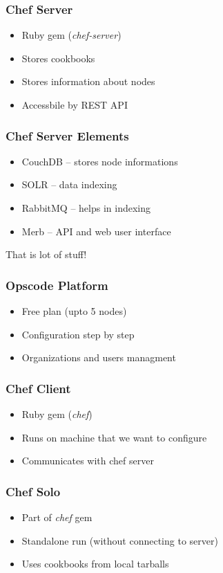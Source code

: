 \documentclass[16pt]{beamer}
\begin{document}
\begin{frame}
  \frametitle{Chef Server}
  \begin{itemize}
    \item Ruby gem (\emph{chef-server})
    \item Stores cookbooks
    \item Stores information about nodes
    \item Accessbile by REST API
  \end{itemize}
\end{frame}

\begin{frame}
  \frametitle{Chef Server Elements}
  \begin{itemize}
    \item CouchDB -- stores node informations
    \item SOLR -- data indexing
    \item RabbitMQ -- helps in indexing
    \item Merb -- API and web user interface
  \end{itemize}
  \pause
  \begin{center}
    \LARGE \color{red} That is lot of stuff!
  \end{center}
\end{frame}

\begin{frame}
  \frametitle{Opscode Platform}
  \begin{itemize}
    \item Free plan (upto 5 nodes)
    \item Configuration step by step
    \item Organizations and users managment
  \end{itemize}
\end{frame}

\begin{frame}
  \frametitle{Chef Client}
  \begin{itemize}
    \item Ruby gem (\emph{chef})
    \item Runs on machine that we want to configure
    \item Communicates with chef server
  \end{itemize}
\end{frame}

\begin{frame}
  \frametitle{Chef Solo}
  \begin{itemize}
    \item Part of \emph{chef} gem
    \item Standalone run (without connecting to server)
    \item Uses cookbooks from local tarballs
  \end{itemize}
\end{frame}
\end{document}
